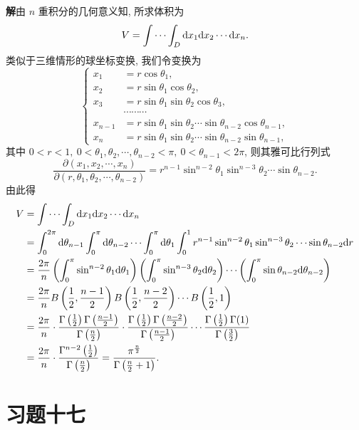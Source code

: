 \documentclass[UTF8,12pt,a4paper,fontset=fandol]{ctexart}
\begin{document}
\noindent\textbf{解}\quad 由 $n$ 重积分的几何意义知, 所求体积为
\[
  V=\idotsint_D \mathrm dx_1\mathrm dx_2\cdots\mathrm dx_n.
\]
类似于三维情形的球坐标变换, 我们令变换为
\[
\left\{
\begin{aligned}
  x_1&=r\cos\theta_1,\\
  x_2&=r\sin\theta_1\cos\theta_2,\\
  x_3&=r\sin\theta_1\sin\theta_2\cos\theta_3,\\
  &\cdots\cdots\cdots\\
  x_{n-1}&=r\sin\theta_1\sin\theta_2\cdots\sin\theta_{n-2}\cos\theta_{n-1},\\
  x_n&=r\sin\theta_1\sin\theta_2\cdots\sin\theta_{n-2}\sin\theta_{n-1},
\end{aligned}
\right.
\]
其中 $0<r<1,\ 0<\theta_1,\theta_2,\cdots,\theta_{n-2}<\pi,\ 0<\theta_{n-1}<2\pi$, 则其雅可比行列式
\[
  \frac{\partial(x_1,x_2,\cdots,x_n)}
  {\partial(r,\theta_1,\theta_2,\cdots,\theta_{n-2})}
  =r^{n-1}\sin^{n-2}\theta_1\sin^{n-3}\theta_2\cdots\sin\theta_{n-2}.
\]
由此得
\[
\begin{aligned}
  V
  &=\idotsint_D \mathrm dx_1\mathrm dx_2\cdots\mathrm dx_n\\
  &=\int_0^{2\pi}\mathrm d\theta_{n-1}\int_0^\pi\mathrm d\theta_{n-2}
    \cdots\int_0^\pi\mathrm d\theta_1\int_0^1
    r^{n-1}\sin^{n-2}\theta_1\sin^{n-3}\theta_2\cdots
    \sin\theta_{n-2}\mathrm dr\\
  &=\frac{2\pi}{n}
    \left(\int_0^\pi\sin^{n-2}\theta_1\mathrm d\theta_1\right)
    \left(\int_0^\pi\sin^{n-3}\theta_2\mathrm d\theta_2\right)\cdots
    \left(\int_0^\pi\sin\theta_{n-2}\mathrm d\theta_{n-2}\right)\\
  &=\frac{2\pi}{n}
    B\left(\frac12,\frac{n-1}{2}\right)
    B\left(\frac12,\frac{n-2}{2}\right)\cdots B\left(\frac12,1\right)\\
  &=\frac{2\pi}{n}\cdot
    \frac{\Gamma\left(\frac12\right)\Gamma\left(\frac{n-1}{2}\right)}{\Gamma\left(\frac n2\right)}
    \cdot
    \frac{\Gamma\left(\frac12\right)\Gamma\left(\frac{n-2}{2}\right)}{\Gamma\left(\frac{n-1}{2}\right)}
    \cdots
    \frac{\Gamma\left(\frac12\right)\Gamma(1)}{\Gamma\left(\frac32\right)}\\
  &=\frac{2\pi}{n}\cdot
    \frac{\Gamma^{n-2}\left(\frac12\right)}{\Gamma\left(\frac n2\right)}
  =\frac{\pi^{\frac n2}}{\Gamma\left(\frac n2+1\right)}.
\end{aligned}
\]

\section*{习题十七}
\end{document}
